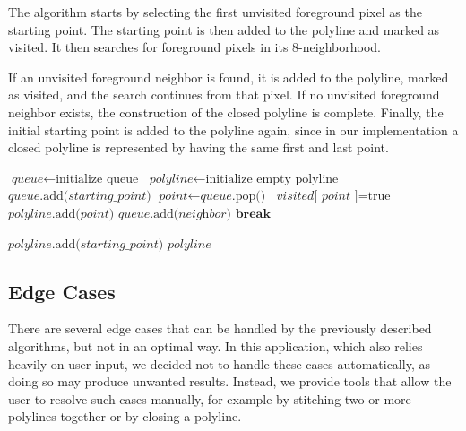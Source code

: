 The algorithm starts by selecting the first unvisited foreground pixel as the starting point. The starting point is then added to the polyline and marked as visited. It then searches for foreground pixels in its 8-neighborhood. 

If an unvisited foreground neighbor is found, it is added to the polyline, marked as visited, and the search continues from that pixel. If no unvisited foreground neighbor exists, the construction of the closed polyline is complete. Finally, the initial starting point is added to the polyline again, since in our implementation a closed polyline is represented by having the same first and last point.

{
	\begin{algorithmic}[1]
		\State $\textit{queue} \gets \text{initialize queue}$
		\State $\textit{polyline} \gets \text{initialize empty polyline}$
		\State
		\State $\textit{queue}\text{.add(}\textit{starting\_point}\text{)}$
		\State $\textit{point} \gets \textit{queue}\text{.pop()}$ 
		\State
		\State $\textit{visited}\text{[}\textit{ point }\text{]} = \text{true}$
		\State $\textit{polyline}\text{.add(}\textit{point}\text{)}$
		\State
		\State $\textit{queue}\text{.add(}\textit{neighbor}\text{)}$
		\State $\textbf{break}$
		\EndIf
		\EndFor
		\EndWhile
		
		\State
		\State $\textit{polyline}\text{.add(}\textit{starting\_point}\text{)}$
		\State 
		\Return $\textit{polyline}$
		\EndProcedure
	\end{algorithmic}
}


\subsection{Edge Cases}

There are several edge cases that can be handled by the previously described algorithms, but not in an optimal way. In this application, which also relies heavily on user input, we decided not to handle these cases automatically, as doing so may produce unwanted results. Instead, we provide tools that allow the user to resolve such cases manually, for example by stitching two or more polylines together or by closing a polyline.


